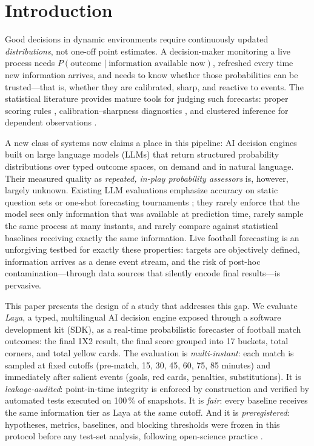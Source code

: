 \documentclass[11pt]{article}
\begin{document}
\section{Introduction}
\label{sec:intro}

Good decisions in dynamic environments require continuously updated
\emph{distributions}, not one-off point estimates. A decision-maker monitoring
a live process needs $P(\text{outcome} \mid \text{information available now})$,
refreshed every time new information arrives, and needs to know whether those
probabilities can be trusted---that is, whether they are calibrated, sharp, and
reactive to events. The statistical literature provides mature tools for
judging such forecasts: proper scoring rules \citep{brier1950,gneiting2007},
calibration--sharpness diagnostics \citep{gneiting2007b,murphy1973}, and
clustered inference for dependent observations \citep{cameron2015}.

A new class of systems now claims a place in this pipeline: AI decision engines
built on large language models (LLMs) that return structured probability
distributions over typed outcome spaces, on demand and in natural language.
Their measured quality as \emph{repeated, in-play probability assessors} is,
however, largely unknown. Existing LLM evaluations emphasize accuracy on
static question sets \citep{hendrycks2021} or one-shot forecasting tournaments
\citep{halawi2024,schoenegger2024}; they rarely enforce that the model sees
only information that was available at prediction time, rarely sample the same
process at many instants, and rarely compare against statistical baselines
receiving exactly the same information. Live football forecasting is an
unforgiving testbed for exactly these properties: targets are objectively
defined, information arrives as a dense event stream, and the risk of post-hoc
contamination---through data sources that silently encode final results---is
pervasive.

This paper presents the design of a study that addresses this gap. We evaluate
\emph{Laya}, a typed, multilingual AI decision engine exposed through a
software development kit (SDK), as a real-time probabilistic forecaster of
football match outcomes: the final 1X2 result, the final score grouped into 17
buckets, total corners, and total yellow cards. The evaluation is
\emph{multi-instant}: each match is sampled at fixed cutoffs (pre-match, 15,
30, 45, 60, 75, 85 minutes) and immediately after salient events (goals, red
cards, penalties, substitutions). It is \emph{leakage-audited}: point-in-time
integrity is enforced by construction and verified by automated tests executed
on 100\,\% of snapshots. It is \emph{fair}: every baseline receives the same
information tier as Laya at the same cutoff. And it is
\emph{preregistered}: hypotheses, metrics, baselines, and blocking thresholds
were frozen in this protocol before any test-set analysis, following
open-science practice \citep{nosek2018,osc2015}.
\end{document}
